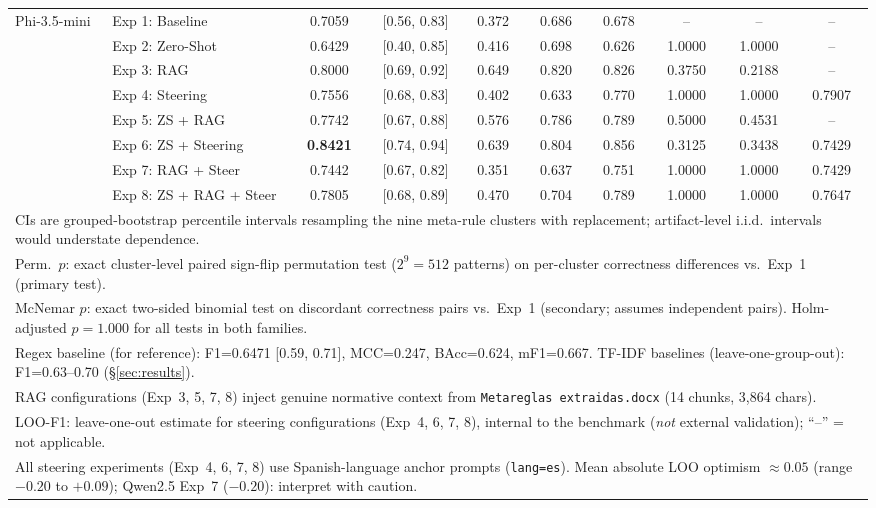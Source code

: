 \documentclass{ieeeaccess}
\begin{document}
\begin{table}[htbp]
{\begin{tabular}{llcccccccc}
\multirow{8}{*}{Phi-3.5-mini}
& Exp 1: Baseline         & 0.7059 & [0.56, 0.83] & 0.372 & 0.686 & 0.678 & --     & -- & -- \\
& Exp 2: Zero-Shot        & 0.6429 & [0.40, 0.85] & 0.416 & 0.698 & 0.626 & 1.0000 & 1.0000 & -- \\
& Exp 3: RAG              & 0.8000 & [0.69, 0.92] & 0.649 & 0.820 & 0.826 & 0.3750 & 0.2188 & -- \\
& Exp 4: Steering         & 0.7556 & [0.68, 0.83] & 0.402 & 0.633 & 0.770 & 1.0000 & 1.0000 & 0.7907 \\
& Exp 5: ZS + RAG         & 0.7742 & [0.67, 0.88] & 0.576 & 0.786 & 0.789 & 0.5000 & 0.4531 & -- \\
& Exp 6: ZS + Steering    & \textbf{0.8421} & [0.74, 0.94] & 0.639 & 0.804 & 0.856 & 0.3125 & 0.3438 & 0.7429 \\
& Exp 7: RAG + Steer      & 0.7442 & [0.67, 0.82] & 0.351 & 0.637 & 0.751 & 1.0000 & 1.0000 & 0.7429 \\
& Exp 8: ZS + RAG + Steer & 0.7805 & [0.68, 0.89] & 0.470 & 0.704 & 0.789 & 1.0000 & 1.0000 & 0.7647 \\

\hline
\multicolumn{10}{l}{\footnotesize CIs are grouped-bootstrap percentile intervals resampling the nine meta-rule clusters with replacement; artifact-level i.i.d.\ intervals would understate dependence.} \\
\multicolumn{10}{l}{\footnotesize Perm.\ $p$: exact cluster-level paired sign-flip permutation test ($2^9=512$ patterns) on per-cluster correctness differences vs.\ Exp~1 (primary test).} \\
\multicolumn{10}{l}{\footnotesize McNemar $p$: exact two-sided binomial test on discordant correctness pairs vs.\ Exp~1 (secondary; assumes independent pairs). Holm-adjusted $p=1.000$ for all tests in both families.} \\
\multicolumn{10}{l}{\footnotesize Regex baseline (for reference): F1=0.6471 [0.59, 0.71], MCC=0.247, BAcc=0.624, mF1=0.667. TF-IDF baselines (leave-one-group-out): F1=0.63--0.70 (§\ref{sec:results}).} \\
\multicolumn{10}{l}{\footnotesize RAG configurations (Exp~3, 5, 7, 8) inject genuine normative context from \texttt{Metareglas extraidas.docx} (14 chunks, 3,864 chars).} \\
\multicolumn{10}{l}{\footnotesize LOO-F1: leave-one-out estimate for steering configurations (Exp~4, 6, 7, 8), internal to the benchmark (\emph{not} external validation); ``--'' = not applicable.} \\
\multicolumn{10}{l}{\footnotesize All steering experiments (Exp~4, 6, 7, 8) use Spanish-language anchor prompts (\texttt{lang=es}). Mean absolute LOO optimism $\approx 0.05$ (range $-0.20$ to $+0.09$); Qwen2.5 Exp~7 ($-0.20$): interpret with caution.} \\
\end{tabular}
}
\end{table}
\end{document}
